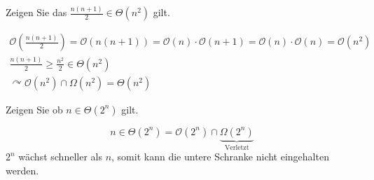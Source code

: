 \documentclass[a4paper,11pt]{exam}
\begin{document}
\begin{questions}
	\question Zeigen Sie das \(\frac{n(n+1)}{2} \in \Theta(n^{2})\) gilt.
	\begin{solution}
		\begin{eqnarray*}
			\mathcal{O}(\frac{n(n+1)}{2}) = \mathcal{O}(n(n+1)) = \mathcal{O}(n) \cdot \mathcal{O}(n+1) = \mathcal{O}(n) \cdot \mathcal{O}(n) = \mathcal{O}(n^{2}) \\
			\frac{n(n+1)}{2} \geq \frac{n^{2}}{2} \in \Theta(n^{2}) \\
			\curvearrowright \mathcal{O}(n^{2}) \cap \Omega(n^{2}) = \Theta(n^{2})
		\end{eqnarray*}
	\end{solution}

	\question Zeigen Sie ob \(n \in \Theta(2^n)\) gilt.
	\begin{solution}
		\[n \in \Theta(2^n) = \mathcal{O}(2^n) \cap \underbrace{\Omega(2^n)}_{\textrm{Verletzt}}\]
		\(2^n\) wächst schneller als \(n\), somit kann die untere Schranke nicht eingehalten werden.
	\end{solution}



\end{questions}
\end{document}
